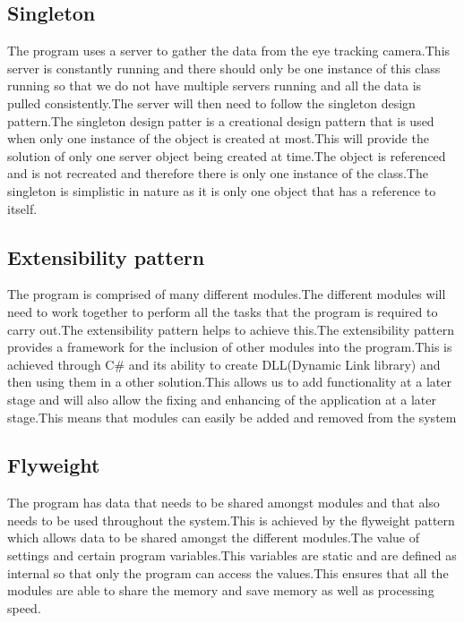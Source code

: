 \subsection{Singleton}
The program uses a server to gather the data from the eye tracking camera.This server is constantly running and there should only be one instance of this class running so that we do not have multiple servers running and all the data is pulled consistently.The server will then need to follow the singleton design pattern.The singleton design patter is a creational design pattern that is used when only one instance of the object is created at most.This will provide the solution of only one server object being created at time.The object is referenced and is not recreated and therefore there is only one instance of the class.The singleton is simplistic in nature as it is only one object that has a reference to itself.
\subsection{Extensibility pattern}
The program is comprised of many different modules.The different modules will need to work together to perform all the tasks that the program is required to carry out.The extensibility pattern helps to achieve this.The extensibility pattern provides a framework for the inclusion of other modules into the program.This is achieved through C\# and its ability to create DLL(Dynamic Link library) and then using them in a other solution.This allows us to add functionality at a later stage and will also allow the fixing and enhancing of the application at a later stage.This means that modules can easily be added and removed from the system
\subsection{Flyweight}
The program has data that needs to be shared amongst modules and that also needs to be used throughout the system.This is achieved by the flyweight pattern which allows data to be shared amongst the different modules.The value of settings and certain program variables.This variables are static and are defined as internal so that only the program can access the values.This ensures that all the modules are able to share the memory and save memory as well as processing speed.

